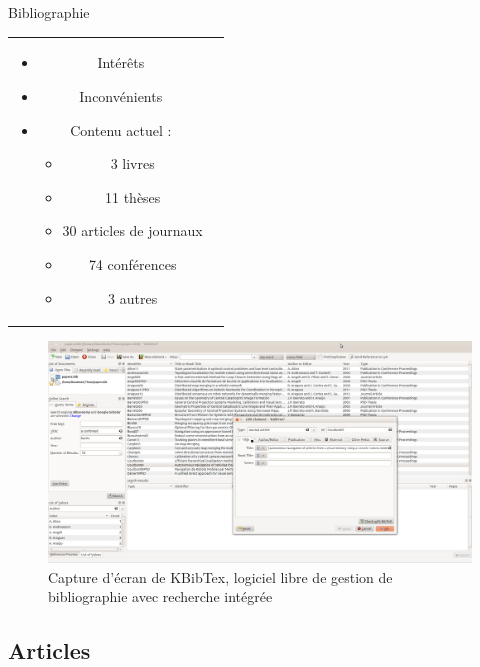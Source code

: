 \documentclass{beamer}
\begin{document}
\begin{frame}{Bibliographie}
\begin{tabular}{c c}
\begin{minipage}{0.6\linewidth}
\begin{itemize}
      \item Intérêts %
      \item Inconvénients
        \vspace{5mm}
      \item<2-> Contenu actuel : %
        \begin{itemize}
        \item 3 livres
        \item 11 thèses
        \item 30 articles de journaux
        \item 74 conférences
        \item 3 autres
        \end{itemize}
      \end{itemize}
    \end{minipage}
  \end{tabular}
\end{frame}

\begin{frame}
  \begin{figure}
    \includegraphics[width=1.0\linewidth]{images/KBibTex.png}
    \caption{Capture d'écran de KBibTex, logiciel libre de gestion de bibliographie avec recherche intégrée}
  \end{figure}
\end{frame}

\subsection*{Articles}
\end{document}
